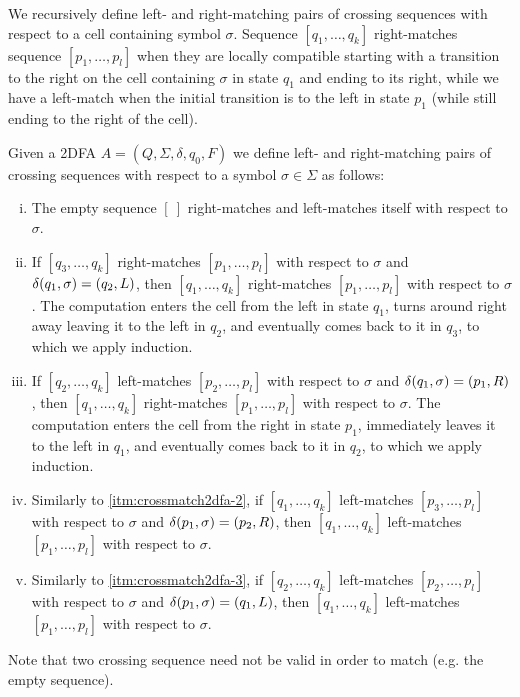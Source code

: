 We recursively define left- and right-matching pairs of crossing sequences with respect to a cell containing symbol $\sigma$.
Sequence $[q_1,\dots,q_k]$ right-matches sequence $[p_1,\dots,p_l]$ when they are locally compatible starting with a transition to the right on the cell containing $\sigma$ in state $q_1$ and ending to its right, while we have a left-match when the initial transition is to the left in state $p_1$ (while still ending to the right of the cell).

\begin{defn}
	Given a 2DFA $A=(Q,\Sigma,\delta,q_0,F)$ we define left- and right-matching pairs of crossing sequences with respect to a symbol $\sigma\in\Sigma$ as follows:
	\begin{enumerate}[i.]
		\item The empty sequence $[~]$ right-matches and left-matches itself with respect to $\sigma$.
		\item \label{itm:crossmatch2dfa-2} If $[q_3,\dots,q_k]$ right-matches $[p_1,\dots,p_l]$ with respect to $\sigma$ and $\delta(q_1,\sigma)=(q_2,L)$, then $[q_1,\dots,q_k]$ right-matches $[p_1,\dots,p_l]$ with respect to $\sigma$. The computation enters the cell from the left in state $q_1$, turns around right away leaving it to the left in $q_2$, and eventually comes back to it in $q_3$, to which we apply induction.
		\item \label{itm:crossmatch2dfa-3} If $[q_2,\dots,q_k]$ left-matches $[p_2,\dots,p_l]$ with respect to $\sigma$ and $\delta(q_1,\sigma)=(p_1,R)$, then $[q_1,\dots,q_k]$ right-matches $[p_1,\dots,p_l]$ with respect to $\sigma$. The computation enters the cell from the right in state $p_1$, immediately leaves it to the left in $q_1$, and eventually comes back to it in $q_2$, to which we apply induction.
		\item Similarly to \ref{itm:crossmatch2dfa-2}, if $[q_1,\dots,q_k]$ left-matches $[p_3,\dots,p_l]$ with respect to $\sigma$ and $\delta(p_1,\sigma)=(p_2,R)$, then $[q_1,\dots,q_k]$ left-matches $[p_1,\dots,p_l]$ with respect to $\sigma$.
		\item Similarly to \ref{itm:crossmatch2dfa-3}, if $[q_2,\dots,q_k]$ left-matches $[p_2,\dots,p_l]$ with respect to $\sigma$ and $\delta(p_1,\sigma)=(q_1,L)$, then $[q_1,\dots,q_k]$ left-matches $[p_1,\dots,p_l]$ with respect to $\sigma$.
	\end{enumerate}
\end{defn}
Note that two crossing sequence need not be valid in order to match (e.g. the empty sequence).


